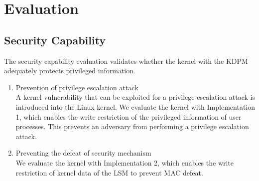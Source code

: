 \section{Evaluation} \label{seciton:evaluation}
\subsection{Security Capability}

The security capability evaluation validates whether the kernel with the
KDPM adequately protects privileged information.

\begin{enumerate}[topsep=0pt]%

\item Prevention of privilege escalation attack\\
%
%
A kernel vulnerability that can be exploited for a privilege escalation attack is
introduced into the Linux kernel.
%
We evaluate the kernel with Implementation 1, which enables the write
restriction of the privileged information of user processes. This prevents an adversary
from performing a privilege escalation attack.

\item Preventing the defeat of security mechanism\\
We evaluate the kernel with Implementation 2, which enables the write
restriction of kernel data of the LSM to prevent MAC defeat.%


\end{enumerate}

